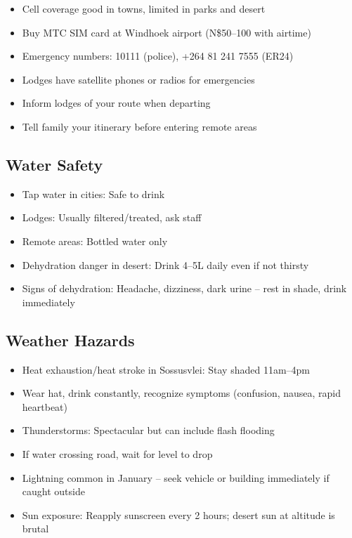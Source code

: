 \documentclass[11pt]{article}
\begin{document}
\begin{itemize}
    \item Cell coverage good in towns, limited in parks and desert
    \item Buy MTC SIM card at Windhoek airport (N\$50--100 with airtime)
    \item Emergency numbers: 10111 (police), +264 81 241 7555 (ER24)
    \item Lodges have satellite phones or radios for emergencies
    \item Inform lodges of your route when departing
    \item Tell family your itinerary before entering remote areas
\end{itemize}

\subsection{Water Safety}

\begin{itemize}
    \item Tap water in cities: Safe to drink
    \item Lodges: Usually filtered/treated, ask staff
    \item Remote areas: Bottled water only
    \item Dehydration danger in desert: Drink 4--5L daily even if not thirsty
    \item Signs of dehydration: Headache, dizziness, dark urine -- rest in shade, drink immediately
\end{itemize}

\subsection{Weather Hazards}

\begin{itemize}
    \item Heat exhaustion/heat stroke in Sossusvlei: Stay shaded 11am--4pm
    \item Wear hat, drink constantly, recognize symptoms (confusion, nausea, rapid heartbeat)
    \item Thunderstorms: Spectacular but can include flash flooding
    \item If water crossing road, wait for level to drop
    \item Lightning common in January -- seek vehicle or building immediately if caught outside
    \item Sun exposure: Reapply sunscreen every 2 hours; desert sun at altitude is brutal
\end{itemize}
\end{document}
